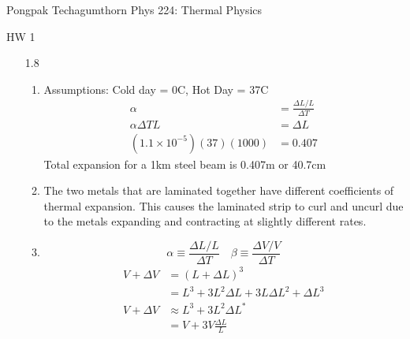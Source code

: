 \documentclass{article}
\begin{document}
\large %
{\Large Pongpak Techagumthorn
\hfill Phys 224: Thermal Physics}
\begin{center}
    {\Large
        HW 1
    }
    \end{center}
\vspace{0.1in}
\begin{enumerate}
    \item [1.8]
    \begin{enumerate}
        \item Assumptions: Cold day = 0\degree C, Hot Day = 37\degree C
            \begin{align*}
                \alpha &= \frac{\Delta L / L}{\Delta T} \\
                \alpha \Delta T L &= \Delta L \\
                (1.1 \times 10^{-5})(37)(1000) &= 0.407
            \end{align*}
            Total expansion for a 1km steel beam is 0.407m or 40.7cm
        \vspace{0.05in}
        \item The two metals that are laminated together have different coefficients of thermal expansion. This causes the laminated strip to curl and uncurl due to the metals expanding and contracting at slightly different rates.
        \vspace{0.05in}
        \item
            \begin{equation*}
                \alpha \equiv \frac{\Delta L / L}{\Delta T} \quad \beta \equiv \frac{\Delta V / V}{\Delta T}
            \end{equation*}
            \begin{align*}
                V + \Delta V &= (L + \Delta L)^3 \\
                &= L^3 + 3L^2 \Delta L + 3L {\Delta L}^2 + {\Delta L}^3 \\
                V + \Delta V & \approx L^3 + 3L^2 \Delta L^{\ast} \\
                &= V + 3V \frac{\Delta L}{L}\\

\end{align*}
\end{enumerate}
\end{enumerate}
\end{document}

